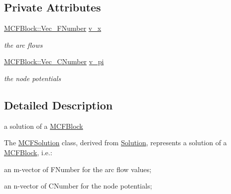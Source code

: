 \subsection*{Private Attributes}
\begin{DoxyCompactItemize}
\item 
\mbox{\label{class_s_m_spp__di__unipi__it_1_1_m_c_f_solution_a1cca58f63b5716e8fe4fa1c1208d7a6c}} 
\mbox{\hyperlink{class_s_m_spp__di__unipi__it_1_1_m_c_f_block_a3797c4b5074703bb8488c17055606ce4}{M\+C\+F\+Block\+::\+Vec\+\_\+\+F\+Number}} \mbox{\hyperlink{class_s_m_spp__di__unipi__it_1_1_m_c_f_solution_a1cca58f63b5716e8fe4fa1c1208d7a6c}{v\+\_\+x}}
\begin{DoxyCompactList}\small\item\em the arc flows \end{DoxyCompactList}\item 
\mbox{\label{class_s_m_spp__di__unipi__it_1_1_m_c_f_solution_a4a6ba1e58bb85a107a261a2dc1d6e62e}} 
\mbox{\hyperlink{class_s_m_spp__di__unipi__it_1_1_m_c_f_block_a9a7c9495f1f1feab22f3c556b70f60f0}{M\+C\+F\+Block\+::\+Vec\+\_\+\+C\+Number}} \mbox{\hyperlink{class_s_m_spp__di__unipi__it_1_1_m_c_f_solution_a4a6ba1e58bb85a107a261a2dc1d6e62e}{v\+\_\+pi}}
\begin{DoxyCompactList}\small\item\em the node potentials \end{DoxyCompactList}\end{DoxyCompactItemize}


\subsection{Detailed Description}
a solution of a \mbox{\hyperlink{class_s_m_spp__di__unipi__it_1_1_m_c_f_block}{M\+C\+F\+Block}} 

The \mbox{\hyperlink{class_s_m_spp__di__unipi__it_1_1_m_c_f_solution}{M\+C\+F\+Solution}} class, derived from \mbox{\hyperlink{class_s_m_spp__di__unipi__it_1_1_solution}{Solution}}, represents a solution of a \mbox{\hyperlink{class_s_m_spp__di__unipi__it_1_1_m_c_f_block}{M\+C\+F\+Block}}, i.\+e.\+:


\begin{DoxyItemize}
\item an m-\/vector of F\+Number for the arc flow values;
\item an n-\/vector of C\+Number for the node potentials;
\end{DoxyItemize}

